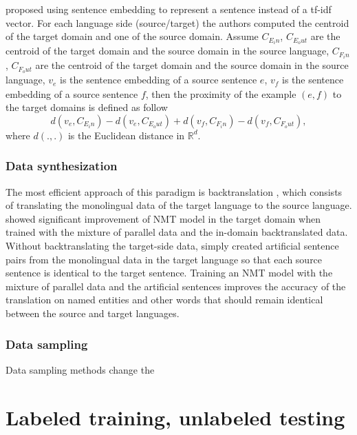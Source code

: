 \cite{Wang17sentence} proposed using sentence embedding to represent a sentence instead of a tf-idf vector. For each language side (source/target) the authors computed the centroid of the target domain and one of the source domain. Assume $C_{E_in}$, $C_{E_out}$ are the centroid of the target domain and the source domain in the source language,  $C_{F_in}$, $C_{F_out}$ are the centroid of the target domain and the source domain in the source language, $v_{\mathit{e}}$ is the sentence embedding of a source sentence $\mathit{e}$, $v_{\mathit{f}}$ is the sentence embedding of a source sentence $\mathit{f}$, then the proximity of the example $(\mathit{e},\mathit{f})$ to the target domains is defined as follow
\begin{equation}
d(v_{\mathit{e}}, C_{E_in}) - d(v_{\mathit{e}}, C_{E_out}) + d(v_{\mathit{f}}, C_{F_in}) - d(v_{\mathit{f}}, C_{F_out}),
\end{equation} 
where $d(.,.)$ is the Euclidean distance in $\mathbb{R}^d$.

\subsubsection{Data synthesization}
The most efficient approach of this paradigm is backtranslation \citep{Sennrich16improving}, which consists of translating the monolingual data of the target language to the source language. \citet{Burlot18using} showed significant improvement of NMT model in the target domain when trained with the mixture of parallel data and the in-domain backtranslated data. Without backtranslating the target-side data, \citet{Currey17copied} simply created artificial sentence pairs from the monolingual data in the target language so that each source sentence is identical to the target sentence. Training an NMT model with the mixture of parallel data and the artificial sentences improves the accuracy of the translation on named entities and other words that should remain identical between the source and target languages. 

\subsubsection{Data sampling}
Data sampling methods change the 
\citet{Wang19dynamically}

\citet{Wees17dynamic}

\section{Labeled training, unlabeled testing}
\label{sec:case3}
